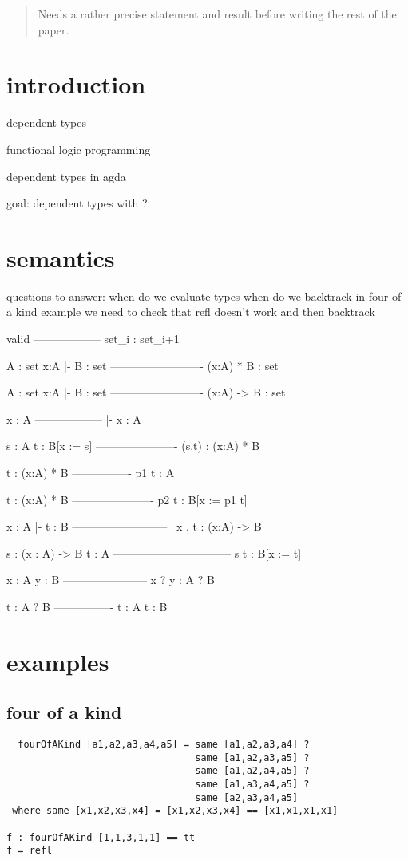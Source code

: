 \documentclass{article}
\begin{document}
\begin{abstract}
  Needs a rather precise statement and result before writing the rest
  of the paper.
  \sloppy
\end{abstract}

\section{introduction}

dependent types

functional logic programming

dependent types in agda

goal: dependent types with ?

\section{semantics}
questions to answer:
  when do we evaluate types
  when do we backtrack
    in four of a kind example we need to check that refl doesn't work and then backtrack

    valid
------------------
set_i : set_{i+1}

A : set    x:A |- B : set
-------------------------
    (x:A) * B : set


A : set    x:A |- B : set
-------------------------
    (x:A) -> B : set

x : A \in \Gamma
------------------
  \Gamma |- x : A

s : A    t : B[x := s]
----------------------
  (s,t) : (x:A) * B


  t : (x:A) * B
----------------
     p1 t : A

     t : (x:A) * B
----------------------
  p2 t : B[x := p1 t]

       x : A |- t : B
--------------------------
   \ x . t : (x:A) -> B

  s : (x : A) -> B      t : A
--------------------------------
          s t : B[x := t]

  x : A       y : B
-----------------------
     x ? y : A ? B

    t : A ? B
----------------
 t : A    t : B

\section{examples}
\subsection{four of a kind}
\begin{verbatim}
  fourOfAKind [a1,a2,a3,a4,a5] = same [a1,a2,a3,a4] ? 
                                 same [a1,a2,a3,a5] ? 
                                 same [a1,a2,a4,a5] ? 
                                 same [a1,a3,a4,a5] ? 
                                 same [a2,a3,a4,a5]
 where same [x1,x2,x3,x4] = [x1,x2,x3,x4] == [x1,x1,x1,x1]

f : fourOfAKind [1,1,3,1,1] == tt
f = refl
\end{verbatim}
\end{document}
